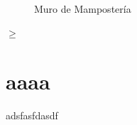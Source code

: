\documentclass[12p]{article}
\begin{document}
	
\begin{figure}[h]
	\centering
	\caption{Muro de Mampostería}
\end{figure}


$\geq$


\section{aaaa}

adsfasfdasdf
\end{document}
